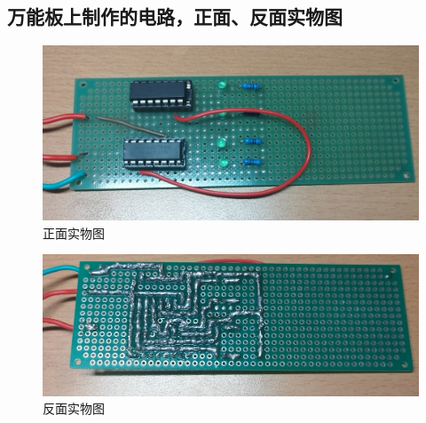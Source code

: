 \documentclass{ctexart}
\begin{document}
\subsection{万能板上制作的电路，正面、反面实物图}
\begin{figure}[H]
    \centering
    \includegraphics[scale=0.1]{pic/实物图正面.jpg}
    \caption{正面实物图}
    \label{正面}
\end{figure}
\begin{figure}[H]
    \centering
    \includegraphics[scale=0.1]{pic/实物图反面.jpg}
    \caption{反面实物图}
    \label{反面}
\end{figure}
\end{document}
